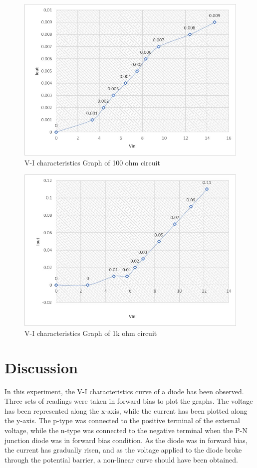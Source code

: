 \begin{figure}[H]
    \centering
    \includegraphics[scale=0.3]{src/exp02/curve2.jpeg}
    \caption{V-I characteristics Graph of 100 ohm circuit}
\end{figure}

\begin{figure}[H]
    \centering
    \includegraphics[scale=0.3]{src/exp02/curve3.jpeg}
    \caption{V-I characteristics Graph of 1k ohm circuit}
\end{figure}

\section{Discussion}
In this experiment, the V-I characteristics curve of a diode has been observed. Three sets of readings were taken in forward bias to plot the graphs. The voltage has been represented along the x-axis, while the current has been plotted along the y-axis. The p-type was connected to the positive terminal of the external voltage, while the n-type was connected to the negative terminal when the P-N junction diode was in forward bias condition. As the diode was in forward bias, the current has gradually risen, and as the voltage applied to the diode broke through the potential barrier, a non-linear curve should have been obtained.

